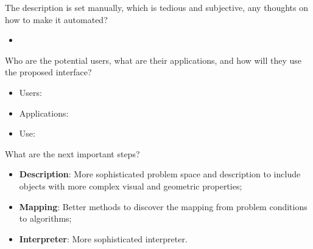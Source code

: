 \documentclass[10pt]{beamer}
\begin{document}
\begin{frame}

\begin{alertblock}{The description is set manually, which is tedious and subjective, any thoughts on how to make it automated?}
\begin{itemize}
\item 
\end{itemize}
\end{alertblock}

\end{frame}

\begin{frame}

\begin{alertblock}{Who are the potential users, what are their applications, and how will they use the proposed interface?}
\begin{itemize}
\item Users:
\item Applications:
\item Use:
\end{itemize}
\end{alertblock}

\end{frame}

\begin{frame}

\begin{alertblock}{What are the next important steps?}
\begin{itemize}
\item \textbf{Description}: More sophisticated problem space and description to include objects with more complex visual and geometric properties;
\item \textbf{Mapping}: Better methods to discover the mapping from problem conditions to algorithms;
\item \textbf{Interpreter}: More sophisticated interpreter.
\end{itemize}
\end{alertblock}

\end{frame}
\end{document}
